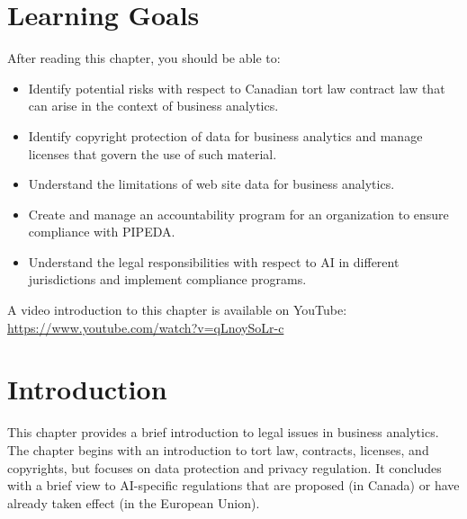 %
%
\section*{Learning Goals}

After reading this chapter, you should be able to:
\begin{itemize}
    \item Identify potential risks with respect to Canadian tort law contract law that can arise in the context of business analytics.
    \item Identify copyright protection of data for business analytics and manage licenses that govern the use of such material. 
    \item Understand the limitations of web site data for business analytics.
    \item Create and manage an accountability program for an organization to ensure compliance with PIPEDA.
    \item Understand the legal responsibilities with respect to AI in different jurisdictions and implement compliance programs.
\end{itemize}

\begin{advanced}
\begin{videobox}
A video introduction to this chapter is available on YouTube:\\

\url{https://www.youtube.com/watch?v=qLnoySoLr-c}
\end{videobox}
\end{advanced}


\section{Introduction}

This chapter provides a brief introduction to legal issues in business analytics. The chapter begins with an introduction to tort law, contracts, licenses, and copyrights, but focuses on data protection and privacy regulation. It concludes with a brief view to AI-specific regulations that are proposed (in Canada) or have already taken effect (in the European Union). 

